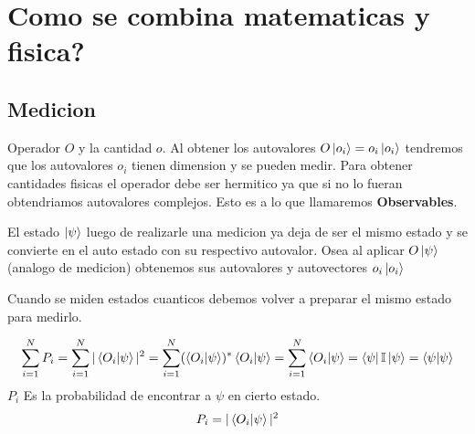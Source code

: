 \documentclass{article}
\newcommand{\caja}[3]{%
  \begin{tcolorbox}[colback=#1!5!white,colframe=#1!25!black,title=#2]
    #3
  \end{tcolorbox}%
}
\begin{document}
\section{Como se combina matematicas y fisica?} %
\label{sec:Como se combina matematicas y fisica?}
\subsection{Medicion}
\caja{green}{Cantidades fisicas (\textbf{Observables})}{
  Operador $O$ y la cantidad $o$. Al obtener los autovalores $ O \ket{o_i}=o_i \ket{o_i } $ tendremos que los autovalores $ o_i  $ tienen dimension y se pueden medir. Para obtener cantidades fisicas el operador debe ser hermitico ya que si no lo fueran obtendriamos autovalores complejos. Esto es a lo que llamaremos \textbf{Observables}. 
}
El estado $ \ket{\psi} $ luego de realizarle una medicion ya deja de ser el mismo estado y se convierte en el auto estado con su respectivo autovalor. Osea al aplicar $ O \ket{\psi} $ (analogo de medicion) obtenemos sus autovalores y autovectores $ o_i \ket{o_i} $

Cuando se miden estados cuanticos debemos volver a preparar el mismo estado para medirlo. 
\caja{black}{Nota }{
  \begin{gather}
    \sum_{i = 1 }^{N } P _i = \sum_{i=1 }^{N }| \bra{O_i }\ket{\psi}|^2 = \sum_{i = 1 }^{N }(\bra{O_i }\ket{\psi} )^* \bra{O_i }\ket{\psi} = \sum_{i = 1 }^{N }\bra{O_i }\ket{\psi} = \bra{\psi}\mathbb{I }\ket{\psi} = \bra{\psi}\ket{\psi}  
  \end{gather}
  $ P_i  $ Es la probabilidad de encontrar a $ \psi  $ en cierto estado. 
  \begin{gather}
    P_i = |\bra{O_i }\ket{\psi}|^2  
    \label{eq:probabilidad_estado}
  \end{gather}
}
\end{document}
